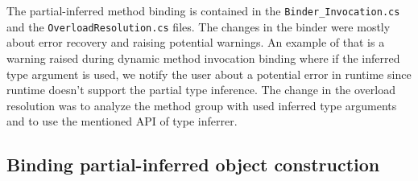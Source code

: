 The partial-inferred method binding is contained in the \texttt{Binder\_Invocation.cs} and the \texttt{OverloadResolution.cs} files. 
The changes in the binder were mostly about error recovery and raising potential warnings. 
An example of that is a warning raised during dynamic method invocation binding where if the inferred type argument is used, we notify the user about a potential error in runtime since runtime doesn’t support the partial type inference. 
The change in the overload resolution was to analyze the method group with used inferred type arguments and to use the mentioned API of type inferrer.

\subsection{Binding partial-inferred object construction}


